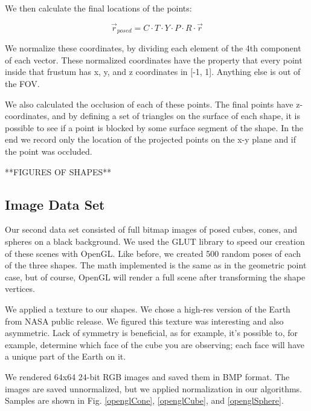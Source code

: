 \documentclass[journal]{IEEEtran}
\begin{document}
We then calculate the final locations of the points:

\begin{equation}
\vec r_{posed} = C \cdot T \cdot Y \cdot P \cdot R \cdot \vec r
\end{equation}

We normalize these coordinates, by dividing each element of the 4th component of each vector. These normalized coordinates have the property that every point inside that frustum has x, y, and z coordinates in [-1, 1]. Anything else is out of the FOV.

We also calculated the occlusion of each of these points. The final points have z-coordinates, and by defining a set of triangles on the surface of each shape, it is possible to see if a point is blocked by some surface segment of the shape. In the end we record only the location of the projected points on the x-y plane and if the point was occluded.

**FIGURES OF SHAPES**

\subsection{Image Data Set}
Our second data set consisted of full bitmap images of posed cubes, cones, and spheres on a black background. We used the GLUT library to speed our creation of these scenes with OpenGL. Like before, we created 500 random poses of each of the three shapes. The math implemented is the same as in the geometric point case, but of course, OpenGL will render a full scene after transforming the shape vertices.

We applied a texture to our shapes. We chose a high-res version of the Earth from NASA public release. We figured this texture was interesting and also asymmetric. Lack of symmetry is beneficial, as for example, it's possible to, for example, determine which face of the cube you are observing; each face will have a unique part of the Earth on it.

We rendered 64x64 24-bit RGB images and saved them in BMP format. The images are saved unnormalized, but we applied normalization in our algorithms.
Samples are shown in Fig. \ref{openglCone}, \ref{openglCube}, and \ref{openglSphere}.
\end{document}
